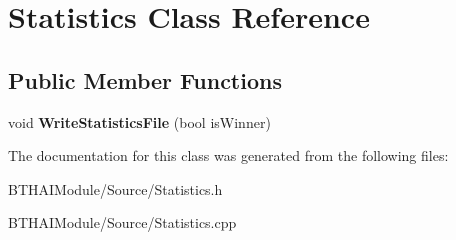 \hypertarget{class_statistics}{\section{Statistics Class Reference}
\label{class_statistics}
}
\subsection*{Public Member Functions}
\begin{DoxyCompactItemize}
\item 
\hypertarget{class_statistics_a1a6722616ec6cd7e1aff4caabad2ec55}{void {\bfseries Write\-Statistics\-File} (bool is\-Winner)}\label{class_statistics_a1a6722616ec6cd7e1aff4caabad2ec55}

\end{DoxyCompactItemize}


The documentation for this class was generated from the following files\-:\begin{DoxyCompactItemize}
\item 
B\-T\-H\-A\-I\-Module/\-Source/Statistics.\-h\item 
B\-T\-H\-A\-I\-Module/\-Source/Statistics.\-cpp\end{DoxyCompactItemize}
